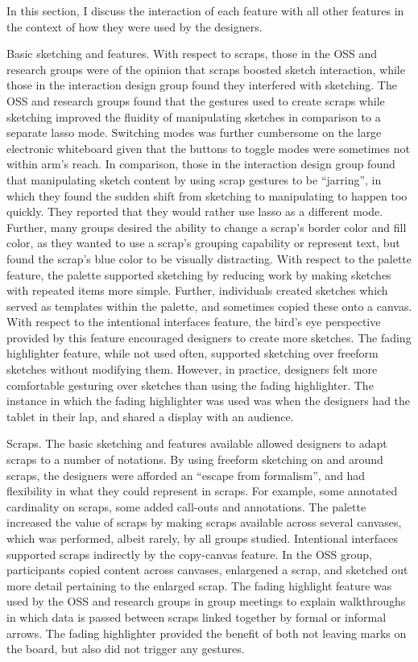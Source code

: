In this section, I discuss the interaction of each feature with all other features in the context of how they were used by the designers.

Basic sketching and features. With respect to scraps, those in the OSS and research groups were of the opinion that scraps boosted sketch interaction, while those in the interaction design group found they interfered with sketching. The OSS and research groups found that the gestures used to create scraps while sketching improved the fluidity of manipulating sketches in comparison to a separate lasso mode. Switching modes was further cumbersome on the large electronic whiteboard given that the buttons to toggle modes were sometimes not within arm's reach. In comparison, those in the interaction design group found that manipulating sketch content by using scrap gestures to be ``jarring'', in which they found the sudden shift from sketching to manipulating to happen too quickly. They reported that they would rather use lasso as a different mode. Further, many groups desired the ability to change a scrap's border color and fill color, as they wanted to use a scrap's grouping capability or represent text, but found the scrap's blue color to be visually distracting. With respect to the palette feature, the palette supported sketching by reducing work by making sketches with repeated items more simple. Further, individuals created sketches which served as templates within the palette, and sometimes copied these onto a canvas. With respect to the intentional interfaces feature, the bird's eye perspective provided by this feature encouraged designers to create more sketches. The fading highlighter feature, while not used often, supported sketching over freeform sketches without modifying them. However, in practice, designers felt more comfortable gesturing over sketches than using the fading highlighter. The instance in which the fading highlighter was used was when the designers had the tablet in their lap, and shared a display with an audience.

Scraps. The basic sketching and features available allowed designers to adapt scraps to a number of notations. By using freeform sketching on and around scraps, the designers were afforded an ``escape from formalism'', and had flexibility in what they could represent in scraps. For example, some annotated cardinality on scraps, some added call-outs and annotations. The palette increased the value of scraps by making scraps available across several canvases, which was performed, albeit rarely, by all groups studied. Intentional interfaces supported scraps indirectly by the copy-canvas feature. In the OSS group, participants copied content across canvases, enlargened a scrap, and sketched out more detail pertaining to the enlarged scrap. The fading highlight feature was used by the OSS and research groups in group meetings to explain walkthroughs in which data is passed between scraps linked together by formal or informal arrows. The fading highlighter provided the benefit of both not leaving marks on the board, but also did not trigger any gestures.

